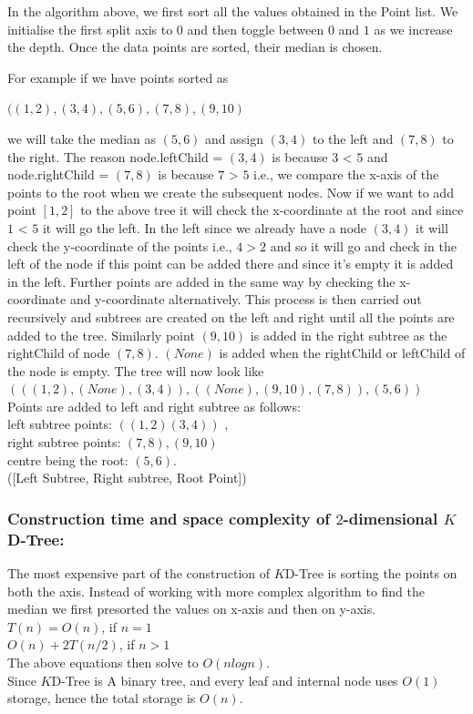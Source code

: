 In the algorithm above, we first sort all the values obtained in the Point list. We initialise the first split axis to $0$ and then toggle between $0$ and $1$ as we increase the depth. Once the data points are sorted, their median is chosen. 
\begin{mscexample}
    For example if we have points sorted as 

                $((1,2),(3,4),(5,6),(7,8),(9,10)$
    
    we will take the median as $(5,6)$ and assign $(3,4)$ to the left and $(7,8)$ to the right. The reason node.leftChild = $(3,4)$ is because $3$ < $5$ and node.rightChild = $(7,8)$ is because $7$ > $5$ i.e., we compare the x-axis of the points to the root when we create the subsequent nodes. Now if we want to add point $[1,2]$ to the above tree it will check the x-coordinate at the root and since $1$ < $5$ it will go the left. In the left since we already have a node $(3,4)$ it will check the y-coordinate of the points i.e., $4>2$ and so it will go and check in the left of the node if this point can be added there and since it's empty it is added in the left. Further points are added in the same way by checking the x-coordinate and y-coordinate alternatively. This process is then carried out recursively and subtrees are created on the left and right until all the points are added to the tree. Similarly point $(9,10)$ is added in the right subtree as the rightChild of
    node $(7,8)$. $(None)$ is added when the rightChild or leftChild of the node is empty. The tree will now look like\\

    $(((1,2),(None),(3,4)),((None),(9,10),(7,8)),(5,6))$\\

    Points are added to left and right subtree as follows:\\
    left subtree points: $((1,2)(3,4))$ ,\\
    right subtree points: $(7,8),(9,10)$ \\ 
    centre being the root: $(5,6)$. \\
    ([Left Subtree, Right subtree, Root Point])
\end{mscexample}

\subsubsection{Construction time and space complexity of $2$-dimensional $K$D-Tree:}

The most expensive part of the construction of $K$D-Tree is sorting the points on both the axis. Instead of working with more complex algorithm to find the median we first presorted the values on x-axis and then on y-axis.\\
$T(n) = O(n)$, if $n = 1$\\
$O(n) + 2T(n/2)$, if $n > 1$\\
The above equations then solve to $O( n log n)$.\\

Since $K$D-Tree is A binary tree, and every leaf and internal node uses $O(1)$ storage, hence the total storage is $O(n)$.


